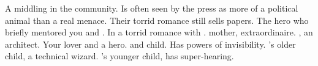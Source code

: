 \documentclass[char]{LRSguildcamp1}
\begin{document}
\begin{contacts}
	\contact{\cOldest{}} A middling \cOldest{\villain} in the community. Is often seen by the press as more of a political animal than a real menace. Their torrid romance still sells papers. 
	\contact{\cOS{}} The hero who briefly mentored you and \cJuggernaut{}. In a torrid romance with \cOldest{}. 
	\contact{\cGrandma{}} \cYoungest{} mother,  \cGrandma{\villain} extraordinaire.  
	\contact{\cArchitect{}} \cYoungest{} \cYoungest{\sibling}, an architect. 
	\contact{\cYoungest{}} Your lover and a hero. 
	\contact{\cGrad{}}  \cOldest{} and \cOS{} child. Has powers of invisibility.  
	\contact{\cTeen{}} \cArchitect{}'s older child, a technical wizard.
	\contact{\cTween{}} \cArchitect{}'s younger child, has super-hearing.  
	
\end{contacts}
\end{document}
